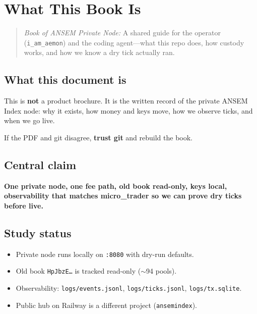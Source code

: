 \chapter{What This Book Is}

\begin{quote}
\textit{Book of ANSEM Private Node:} A shared guide for the operator (\texttt{i\_am\_aemon}) and the coding agent---what this repo does, how custody works, and how we know a dry tick actually ran.
\end{quote}

\section{What this document is}

This is \textbf{not} a product brochure. It is the written record of the private ANSEM Index node: why it exists, how money and keys move, how we observe ticks, and when we go live.

If the PDF and git disagree, \textbf{trust git} and rebuild the book.

\section{Central claim}

\textbf{One private node, one fee path, old book read-only, keys local, observability that matches micro\_trader so we can prove dry ticks before live.}

\section{Study status}

\begin{itemize}
  \item Private node runs locally on \texttt{:8080} with dry-run defaults.
  \item Old book \texttt{HpJbzE\ldots} is tracked read-only ($\sim$94 pools).
  \item Observability: \texttt{logs/events.jsonl}, \texttt{logs/ticks.jsonl}, \texttt{logs/tx.sqlite}.
  \item Public hub on Railway is a different project (\texttt{ansemindex}).
\end{itemize}
